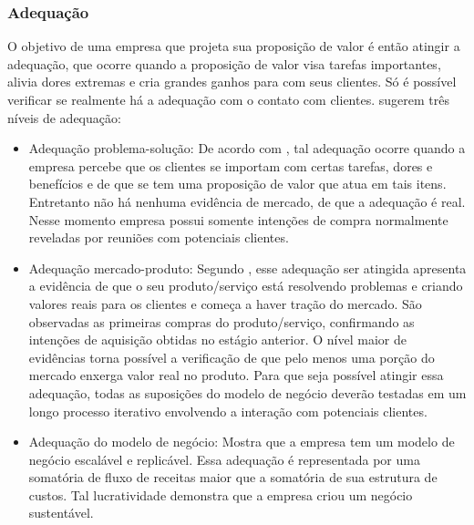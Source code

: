 \subsubsection{Adequação}
\label{cha:adequação}
O objetivo de uma empresa que projeta sua proposição de valor é então atingir a adequação, que ocorre quando a proposição de valor visa tarefas importantes, alivia dores extremas e cria grandes ganhos para com seus clientes. Só é possível verificar se realmente há a adequação com o contato com clientes.  sugerem três níveis de adequação:
\begin{itemize}
\item Adequação problema-solução: De acordo com , tal adequação ocorre quando a empresa percebe que os clientes se importam com certas tarefas, dores e benefícios e de que se tem uma proposição de valor que atua em tais itens. Entretanto não há nenhuma evidência de mercado, de que a adequação é real. Nesse momento empresa possui somente intenções de compra normalmente reveladas por reuniões com potenciais clientes.
\item Adequação mercado-produto: Segundo , esse adequação ser atingida apresenta a evidência de que o seu produto/serviço está resolvendo problemas e criando valores reais para os clientes e começa a haver tração do mercado. São observadas as primeiras compras do produto/serviço, confirmando as intenções de aquisição obtidas no estágio anterior. O nível maior de evidências torna possível a verificação de que pelo menos uma porção do mercado enxerga valor real no produto. Para que seja possível atingir essa adequação, todas as suposições do modelo de negócio deverão testadas em um longo processo iterativo envolvendo a interação com potenciais clientes.
\item Adequação do modelo de negócio: Mostra que a empresa tem um modelo de negócio escalável e replicável. Essa adequação é representada por uma somatória de fluxo de receitas maior que a somatória de sua estrutura de custos. Tal lucratividade demonstra que a empresa criou um negócio sustentável. \cite{valueproposition}
\end{itemize}

